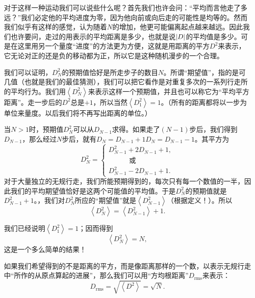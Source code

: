 对于这样一种运动我们可以说些什么呢？首先我们也许会问：“平均而言他走了多远？”我们必定他的平均进度为零，因为他向前或向后走的可能性是均等的。然而我们似乎有这样的感觉，认为随着$N$的增加，他更可能偏离起点越来越远。因此我们也许要问，走过的用表示的平均距离是多少，也就是说$\lvert D\rvert$的平均值是多少。可是在这里用另一个量度“进度”的方法更为方便，这就是用距离的平方$D^2$来表示，它无论对正的还是负的移动都为正，所以它是这种随机漫步的一个合理。

我们可以证明，$D_N^2$的预期值恰好是所走步子的数目$N$。所谓“期望值”，指的是可几值（也就是我们的最佳猜测），我们可以把它看作是对重复多次的一系列行走所的平均行为。我们用$\left <D_N^2 \right >$来表示这样一个预期值，并且也可以称它为“平均平方距离”。走一步后的$D^2$总是$+1$，所以当然$\left < D_1^2 \right >=1$。（所有的距离都将以一步为单位来量度。以后我们将不再写出距离的单位。）

当$N>1$时，预期值$D_N^2$可以从$D_{N-1}$求得。如果走了$(N-1)$步后，我们得到$D_{N-1}$，那么经过$N$步后，就有$D_N=D_{N-1}+1$$D_N=D_{N-1}-1$。其平方为
\begin{equation}
\label{Eq:I:6:7}
D_N^2=
\begin{cases}
D_{N-1}^2+2D_{N-1}+1,\\[2ex]
\quad\qquad\textit{或}\\[2ex]
D_{N-1}^2-2D_{N-1}+1.
\end{cases}
\end{equation}
对于大量独立的无规行走，我们所能预期得到的，每次只有每一个数值的一半，因此我们的平均期望值恰好是这两个可能值的平均值。于是$D_N^2$的预期值就是$D_{N-1}^2+1$。，我们对$D_N^2$所应的“期望值”就是$\left <D_{N-1}^2 \right >$（根据定义！）。所以
\begin{equation}
\label{Eq:I:6:8}
\left < D_N^2 \right >=\left < D_{N-1}^2 \right >+1.
\end{equation}

我们已经说明$\left < D_1^2 \right > = 1$；因而得到
\begin{equation}
\label{Eq:I:6:9}
\left < D_N^2 \right > =N,
\end{equation} 
这是一个多么简单的结果！

如果我们希望得到的不是距离的平方，而是像距离那样的一个数，以表示无规行走中“所作的从原点算起的进展”，那么我们可以用“方均根距离”$D_{\text{rms}}$来表示：
\begin{equation}
\label{Eq:I:6:10}
D_{\text{rms}}=\sqrt{\left < D^2 \right > }=\sqrt{N}.
\end{equation}

